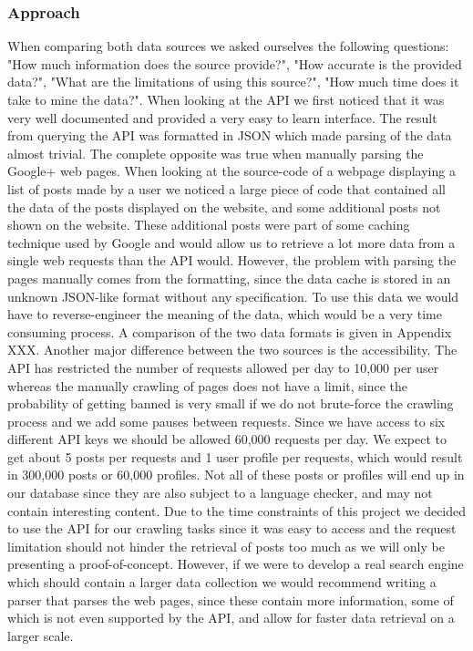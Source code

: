 \subsubsection*{Approach}
When comparing both data sources we asked ourselves the following questions: "How much information does the source provide?", "How accurate is the provided data?", "What are the limitations of using this source?", "How much time does it take to mine the data?". When looking at the API we first noticed that it was very well documented and provided a very easy to learn interface. The result from querying the API was formatted in JSON which made parsing of the data almost trivial. The complete opposite was true when manually parsing the Google+ web pages. When looking at the source-code of a webpage displaying a list of posts made by a user we noticed a large piece of code that contained all the data of the posts displayed on the website, and some additional posts not shown on the website. These additional posts were part of some caching technique used by Google and would allow us to retrieve a lot more data from a single web requests than the API would. However, the problem with parsing the pages manually comes from the formatting, since the data cache is stored in an unknown JSON-like format without any specification. To use this data we would have to reverse-engineer the meaning of the data, which would be a very time consuming process. A comparison of the two data formats is given in Appendix XXX.
Another major difference between the two sources is the accessibility. The API has restricted the number of requests allowed per day to 10,000 per user whereas the manually crawling of pages does not have a limit, since the probability of getting banned is very small if we do not brute-force the crawling process and we add some pauses between requests. Since we have access to six different API keys we should be allowed 60,000 requests per day. We expect to get about 5 posts per requests and 1 user profile per requests, which would result in 300,000 posts or 60,000 profiles. Not all of these posts or profiles will end up in our database since they are also subject to a language checker, and may not contain interesting content.
Due to the time constraints of this project we decided to use the API for our crawling tasks since it was easy to access and the request limitation should not hinder the retrieval of posts too much as we will only be presenting a proof-of-concept. However, if we were to develop a real search engine which should contain a larger data collection we would recommend writing a parser that parses the web pages, since these contain more information, some of which is not even supported by the API, and allow for faster data retrieval on a larger scale.

